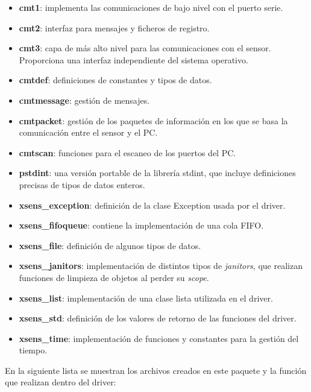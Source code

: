 \documentclass[12pt, a4paper]{report}
\begin{document}
\begin{itemize}

\item \textbf{cmt1}: implementa las comunicaciones de bajo nivel con el puerto serie.
\item \textbf{cmt2}: interfaz para mensajes y ficheros de registro.
\item \textbf{cmt3}: capa de más alto nivel para las comunicaciones con el sensor. Proporciona una interfaz independiente del sistema operativo.
\item \textbf{cmtdef}: definiciones de constantes y tipos de datos.
\item \textbf{cmtmessage}: gestión de mensajes.
\item \textbf{cmtpacket}: gestión de los paquetes de información en los que se basa la comunicación entre el sensor y el PC.
\item \textbf{cmtscan}: funciones para el escaneo de los puertos del PC.
\item \textbf{pstdint}: una versión portable de la librería stdint, que incluye definiciones precisas de tipos de datos enteros. 
\item \textbf{xsens\_exception}: definición de la clase Exception usada por el driver.
\item \textbf{xsens\_fifoqueue}: contiene la implementación de una cola FIFO.
\item \textbf{xsens\_file}: definición de algunos tipos de datos.
\item \textbf{xsens\_janitors}: implementación de distintos tipos de \textit{janitors}, que realizan funciones de limpieza de objetos al perder su \textit{scope}.
\item \textbf{xsens\_list}: implementación de una clase lista utilizada en el driver.
\item \textbf{xsens\_std}: definición de los valores de retorno de las funciones del driver.
\item \textbf{xsens\_time}: implementación de funciones y constantes para la gestión del tiempo.

\end{itemize}

En la siguiente lista se muestran los archivos creados en este paquete y la función que realizan dentro del driver:
\end{document}
